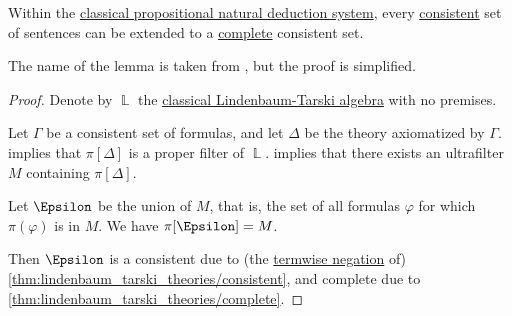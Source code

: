 \begin{lemma}\label{thm:extension_to_complete_consistent_set}
  Within the \hyperref[def:abstract_natural_deduction_system]{classical propositional natural deduction system}, every \hyperref[def:consistent_set_of_sentences]{consistent} set of sentences can be extended to a \hyperref[def:complete_set_of_sentences]{complete} consistent set.
\end{lemma}
\begin{comments}
  \item The name of the lemma is taken from , but the proof is simplified.
\end{comments}
\begin{proof}
  Denote by \( \BbbL \) the \hyperref[thm:lindenbaum_tarski_algebras]{classical Lindenbaum-Tarski algebra} with no premises.

  Let \( \Gamma \) be a consistent set of formulas, and let \( \Delta \) be the theory axiomatized by \( \Gamma \).  implies that \( \pi[\Delta] \) is a proper filter of \( \BbbL \).  implies that there exists an ultrafilter \( M \) containing \( \pi[\Delta] \).

  Let \( \Epsilon \) be the union of \( M \), that is, the set of all formulas \( \varphi \) for which \( \pi(\varphi) \) is in \( M \). We have \( \pi[\Epsilon] = M \).

  Then \( \Epsilon \) is a consistent due to (the \hyperref[thm:classical_equivalences/biconditional_member_negation]{termwise negation} of) \cref{thm:lindenbaum_tarski_theories/consistent}, and complete due to \cref{thm:lindenbaum_tarski_theories/complete}.
\end{proof}

